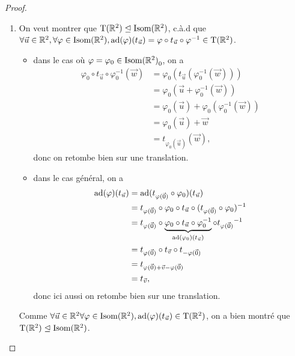 \documentclass{book}
\numberwithin{equation}{section}
\renewcommand{\phi}{\varphi}
\providecommand{\plan}{{\mathbb R^2}}
\providecommand{\origin}{{\vec 0}}
\providecommand{\transR}{{\textnormal{T}(\plan)}}
\providecommand{\isom}{{\textnormal{Isom}(\plan)}}
\providecommand{\isomo}{{\isom_0}}
\providecommand{\trans}[1]{{t_{#1}}}
\providecommand{\ad}{{\textnormal{ad}}}
\providecommand{\subgroupnormaleq}{\trianglelefteq}
\begin{document}
\begin{proof}
\begin{enumerate}
		\item On veut montrer que $\transR \subgroupnormaleq \isom$, c.à.d que $\forall \vec u \in \plan, \forall \phi \in \isom, \ad(\phi)(\trans{\vec u}) = \phi \circ \trans{\vec u} \circ \phi^{-1} \in \transR$.
		\begin{itemize}
			\item dans le cas où $\phi = \phi_0 \in \isomo$, on a
				\begin{align*}
					\phi_0 \circ \trans{\vec u} \circ \phi_0^{-1}(\vec w) &= \phi_0(\trans{\vec u}(\phi_0^{-1}(\vec w)))\\
					&= \phi_0(\vec u + \phi_0^{-1}(\vec w))\\
					&= \phi_0(\vec u) + \phi_0(\phi_0^{-1}(\vec w))\\
					&= \phi_0(\vec u) + \vec w\\
					&= \trans{\phi_0(\vec u)}(\vec w),
				\end{align*}
				donc on retombe bien sur une translation.
			\item dans le cas général, on a
				\begin{align*}
					\ad(\phi)(\trans{\vec u}) &= \ad(\trans{\phi(\origin)} \circ \phi_0)(\trans{\vec u})\\
					&= \trans{\phi(\origin)} \circ \phi_0 \circ \trans{\vec u} \circ (\trans{\phi(\origin)} \circ \phi_0)^{-1} \\
					&= \trans{\phi(\origin)} \circ \underbrace{\phi_0 \circ \trans{\vec u} \circ \phi_0^{-1}}_{\ad(\phi_0)(\trans{\vec u})} \circ \trans{\phi(\origin)}^{-1}\\
					&= \trans{\phi(\origin)} \circ \trans{\vec v} \circ \trans{-\phi(\origin)}\\
					&= \trans{\phi(\origin) + \vec v - \phi(\origin)}\\
					&= \trans{\vec v},
				\end{align*}
				donc ici aussi on retombe bien sur une translation.
		\end{itemize}
		Comme $\forall \vec u \in \plan \forall \phi \in \isom, \ad(\phi)(\trans{\vec u}) \in \transR$, on a bien montré que $\transR \subgroupnormaleq \isom$.
	\end{enumerate}
\end{proof}
\end{document}

